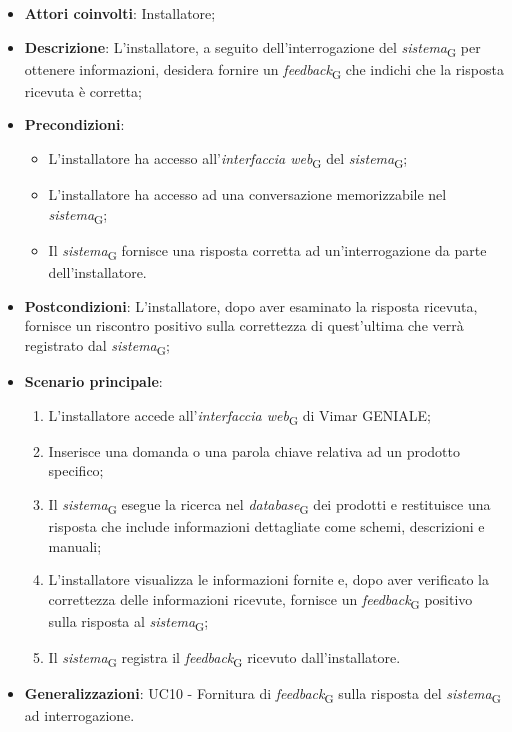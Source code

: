 \begin{itemize}
    \item \textbf{Attori coinvolti}: Installatore;
    \item \textbf{Descrizione}: L’installatore, a seguito dell’interrogazione del \textit{sistema}\textsubscript{G} per ottenere informazioni, desidera fornire un \textit{feedback}\textsubscript{G} che indichi che la risposta ricevuta è corretta;
    \item \textbf{Precondizioni}: 
    \begin{itemize}
        \item L’installatore ha accesso all’\textit{interfaccia web}\textsubscript{G} del \textit{sistema}\textsubscript{G};
        \item L’installatore ha accesso ad una conversazione memorizzabile nel \textit{sistema}\textsubscript{G};
        \item Il \textit{sistema}\textsubscript{G} fornisce una risposta corretta ad un’interrogazione da parte dell’installatore.
    \end{itemize}
    \item \textbf{Postcondizioni}: L’installatore, dopo aver esaminato la risposta ricevuta, fornisce un riscontro positivo sulla correttezza di quest’ultima che verrà registrato dal \textit{sistema}\textsubscript{G};
    \item \textbf{Scenario principale}:
    \begin{enumerate}
        \item L’installatore accede all’\textit{interfaccia web}\textsubscript{G} di Vimar GENIALE;
        \item Inserisce una domanda o una parola chiave relativa ad un prodotto specifico;
        \item Il \textit{sistema}\textsubscript{G} esegue la ricerca nel \textit{database}\textsubscript{G} dei prodotti e restituisce una risposta che include informazioni dettagliate come schemi, descrizioni e manuali;
        \item L’installatore visualizza le informazioni fornite e, dopo aver verificato la correttezza delle informazioni ricevute, fornisce un \textit{feedback}\textsubscript{G} positivo sulla risposta al \textit{sistema}\textsubscript{G};
        \item Il \textit{sistema}\textsubscript{G} registra il \textit{feedback}\textsubscript{G} ricevuto dall’installatore.
    \end{enumerate}
    \item \textbf{Generalizzazioni}: UC10 - Fornitura di \textit{feedback}\textsubscript{G} sulla risposta del \textit{sistema}\textsubscript{G} ad interrogazione.
\end{itemize}

